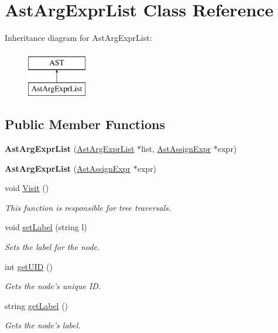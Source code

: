 \hypertarget{classAstArgExprList}{\section{Ast\-Arg\-Expr\-List Class Reference}
\label{classAstArgExprList}
}
Inheritance diagram for Ast\-Arg\-Expr\-List\-:\begin{figure}[H]
\begin{center}
\leavevmode
\includegraphics[height=2.000000cm]{classAstArgExprList}
\end{center}
\end{figure}
\subsection*{Public Member Functions}
\begin{DoxyCompactItemize}
\item 
\hypertarget{classAstArgExprList_a6aafae6eaadd5db52a33768136657610}{{\bfseries Ast\-Arg\-Expr\-List} (\hyperlink{classAstArgExprList}{Ast\-Arg\-Expr\-List} $\ast$list, \hyperlink{classAstAssignExpr}{Ast\-Assign\-Expr} $\ast$expr)}\label{classAstArgExprList_a6aafae6eaadd5db52a33768136657610}

\item 
\hypertarget{classAstArgExprList_a4acc4d03bbbe66b9a19e991d21169414}{{\bfseries Ast\-Arg\-Expr\-List} (\hyperlink{classAstAssignExpr}{Ast\-Assign\-Expr} $\ast$expr)}\label{classAstArgExprList_a4acc4d03bbbe66b9a19e991d21169414}

\item 
void \hyperlink{classAstArgExprList_aeac192a90197b0de59114cea84a1e577}{Visit} ()
\begin{DoxyCompactList}\small\item\em This function is responsible for tree traversals. \end{DoxyCompactList}\item 
void \hyperlink{classAST_a71d680856e95ff89f55d5311a552eba6}{set\-Label} (string l)
\begin{DoxyCompactList}\small\item\em Sets the label for the node. \end{DoxyCompactList}\item 
int \hyperlink{classAST_ab7a5b1d9f1c2de0d98deb356f724a42c}{get\-U\-I\-D} ()
\begin{DoxyCompactList}\small\item\em Gets the node's unique I\-D. \end{DoxyCompactList}\item 
string \hyperlink{classAST_aee029be902fffc927d16ccb03eb922ad}{get\-Label} ()
\begin{DoxyCompactList}\small\item\em Gets the node's label. \end{DoxyCompactList}\end{DoxyCompactItemize}
